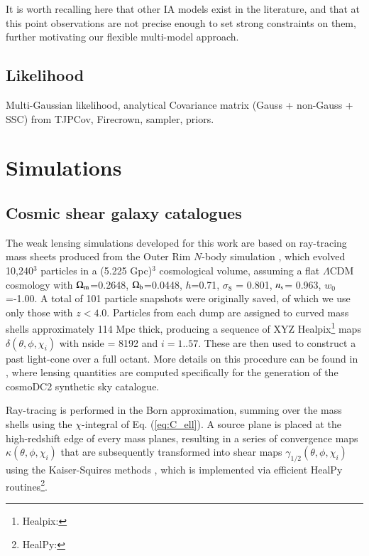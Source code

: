 \documentclass[useAMS,usenatbib]{mn2e}
\begin{document}
It is worth recalling here that other IA models exist in the literature, and that at this point observations are not precise enough to set strong constraints on them, further motivating our flexible multi-model approach.  


\subsection{Likelihood}
\label{subsec:likelihood}

Multi-Gaussian likelihood, analytical Covariance matrix (Gauss + non-Gauss + SSC) from {\sc TJPCov}, Firecrown, sampler, priors.

\section{Simulations}
\label{sec:sims}

\subsection{Cosmic shear galaxy catalogues} 
\label{subsec:WL_cats}

The weak lensing simulations developed for this work are based on ray-tracing mass sheets produced from the Outer Rim $N$-body simulation \citep{OuterRim}, which evolved 10,240$^3$ particles in a (5.225 Gpc)$^3$ cosmological volume, assuming a flat $\Lambda$CDM cosmology with $\Omega_{\rm m}$=0.2648, $\Omega_{\rm b}$=0.0448, $h$=0.71, $\sigma_8$ = 0.801, $n_{\rm s}$= 0.963, $w_0$=-1.00. A total of 101 particle snapshots were originally saved, of which we use only those with $z<4.0$. Particles from each dump are assigned to curved mass shells approximately 114 Mpc thick, producing a sequence of XYZ {\sc Healpix}\footnote{{\sc Healpix}:} maps $\delta(\theta,\phi,\chi_i)$ with {\sc nside} = 8192 and $i=1..57$. These are then used to construct a past light-cone over a full octant. More details on this procedure can be found  in \citet{cosmoDC}, where lensing quantities are computed specifically for the generation of the {\sc cosmoDC2}  synthetic sky catalogue.

Ray-tracing is performed in the Born approximation, summing over the mass shells using the $\chi$-integral of Eq. (\ref{eq:C_ell}). A source plane is placed at the high-redshift edge of every mass planes, resulting in a series of convergence  maps  $\kappa(\theta,\phi,\chi_i)$ that are subsequently transformed into shear maps $\gamma_{1/2}(\theta,\phi,\chi_i)$ using the Kaiser-Squires methods \citep{KS}, which is implemented via efficient {\sc HealPy} routines\footnote{{\sc HealPy:}}.
\end{document}
